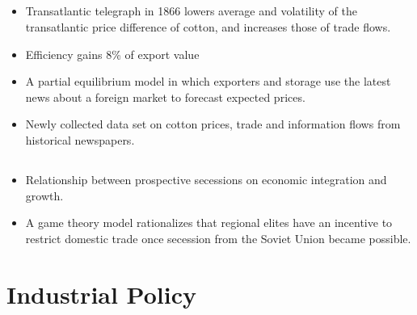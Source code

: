 \documentclass[10pt]{article} %
\begin{document}
    \subsection{\cite{Steinwender2018}}
    \begin{itemize}
        \item Transatlantic telegraph in 1866 lowers average and volatility of the transatlantic price difference of cotton, and increases those of trade flows. 
        \item Efficiency gains 8\% of export value
        \item A partial equilibrium model in which exporters and storage use the latest news about a foreign market to forecast expected prices.
        \item Newly collected data set on cotton prices, trade and information flows from historical newspapers.
    \end{itemize}

    \subsection{\cite{Suesse2018}}
    \begin{itemize}
        \item Relationship between prospective secessions on economic integration and growth.
        \item A game theory model rationalizes that regional elites have an incentive to restrict domestic trade once secession from the Soviet Union became possible.
    \end{itemize}

\section{Industrial Policy}
    \subsection{\cite{JuhaszLaneRodrik2023}}
\end{document}
